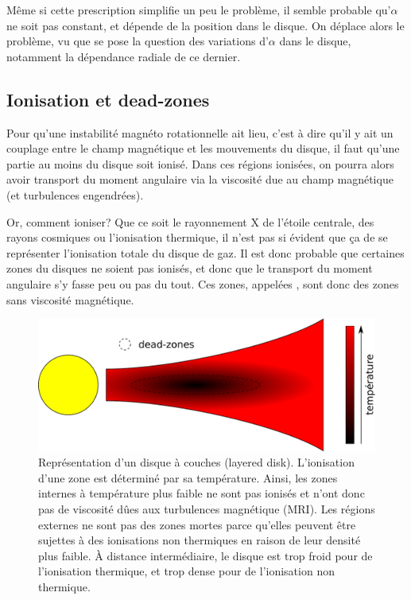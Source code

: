 Même si cette prescription simplifie un peu le problème, il semble probable qu'$\alpha$ ne soit pas constant, et dépende de la position dans le disque. On déplace alors le problème, vu que se pose la question des variations d'$\alpha$ dans le disque, notamment la dépendance radiale de ce dernier.

\subsection{Ionisation et dead-zones}
Pour qu'une instabilité magnéto rotationnelle ait lieu, c'est à dire qu'il y ait un couplage entre le champ magnétique et les mouvements du disque, il faut qu'une partie au moins du disque soit ionisé. Dans ces régions ionisées, on pourra alors avoir transport du moment angulaire via la viscosité due au champ magnétique (et turbulences engendrées). 

Or, comment ioniser? Que ce soit le rayonnement X de l'étoile centrale, des rayons cosmiques ou l'ionisation thermique, il n'est pas si évident que ça de se représenter l'ionisation totale du disque de gaz. Il est donc probable que certaines zones du disques ne soient pas ionisés, et donc que le transport du moment angulaire s'y fasse peu ou pas du tout. Ces zones, appelées , sont donc des zones sans viscosité magnétique. %

\begin{figure}[htb]
\centering
\includegraphics[width=0.7\linewidth]{figure/dead_zones.pdf}
\caption{Représentation d'un disque à couches (layered disk). L'ionisation d'une zone est déterminé par sa température. Ainsi, les zones internes à température plus faible ne sont pas ionisés et n'ont donc pas de viscosité dûes aux turbulences magnétique (MRI). Les régions externes ne sont pas des zones mortes parce qu'elles peuvent être sujettes à des ionisations non thermiques en raison de leur densité plus faible. À distance intermédiaire, le disque est trop froid pour de l'ionisation thermique, et trop dense pour de l'ionisation non thermique.}\label{fig:dead_zones}
\end{figure}


